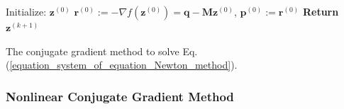 \documentclass[lang=cn,10pt]{gorgeousnbook}
\numberwithin{equation}{section}%
\numberwithin{figure}{section}%
\begin{document}
\SetAlCapSkip{0.5em}
\IncMargin{0.8em}
\begin{algorithm2e}[!t]
\DontPrintSemicolon
    Initialize: $\boldsymbol{z}^{(0)}$\;
    $\boldsymbol{r}^{(0)} := -\nabla f(\boldsymbol{z}^{(0)}) = \boldsymbol{q} - \boldsymbol{M}\boldsymbol{z}^{(0)}$, $\boldsymbol{p}^{(0)} := \boldsymbol{r}^{(0)}$\;
    \textbf{Return} $\boldsymbol{z}^{(k+1)}$
\caption{The conjugate gradient method to solve Eq. (\ref{equation_system_of_equation_Newton_method}).}\label{algorithm_conjugate_gradient}
\end{algorithm2e}
\DecMargin{0.8em}

\subsubsection{Nonlinear Conjugate Gradient Method}

\end{document}

